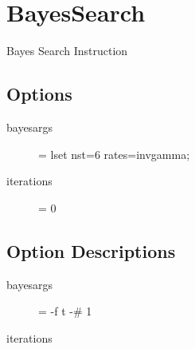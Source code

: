 \section{BayesSearch}

Bayes Search Instruction

\subsection{Options}
\begin{description}
\item[bayesargs] = lset nst=6 rates=invgamma;
\item[iterations] = 0
\end{description}

\subsection{Option Descriptions}
\begin{description}
\item[bayesargs] = -f t -\# 1
\item[iterations]

\end{description} 